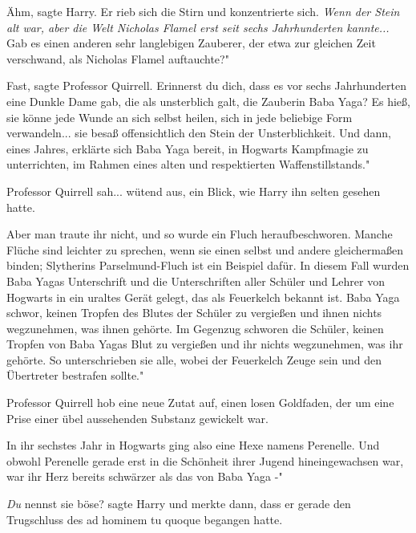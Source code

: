 \glqq{}Ähm\grqq{}, sagte Harry. Er rieb sich die Stirn und konzentrierte sich.
\emph{Wenn der Stein alt war, aber die Welt Nicholas Flamel erst seit sechs
Jahrhunderten kannte...} \glqq{}Gab es einen anderen sehr langlebigen Zauberer,
der etwa zur gleichen Zeit verschwand, als Nicholas Flamel auftauchte?"

\glqq{}Fast\grqq{}, sagte Professor Quirrell. \glqq{}Erinnerst du dich, dass es
vor sechs Jahrhunderten eine Dunkle Dame gab, die als unsterblich galt, die
Zauberin Baba Yaga? Es hieß, sie könne jede Wunde an sich selbst heilen, sich in
jede beliebige Form verwandeln... sie besaß offensichtlich den Stein der
Unsterblichkeit. Und dann, eines Jahres, erklärte sich Baba Yaga bereit, in
Hogwarts Kampfmagie zu unterrichten, im Rahmen eines alten und respektierten
Waffenstillstands."

Professor Quirrell sah... wütend aus, ein Blick, wie Harry ihn selten gesehen
hatte.

\glqq{}Aber man traute ihr nicht, und so wurde ein Fluch heraufbeschworen. Manche
Flüche sind leichter zu sprechen, wenn sie einen selbst und andere gleichermaßen
binden; Slytherins Parselmund-Fluch ist ein Beispiel dafür. In diesem Fall
wurden Baba Yagas Unterschrift und die Unterschriften aller Schüler und Lehrer
von Hogwarts in ein uraltes Gerät gelegt, das als Feuerkelch bekannt ist. Baba
Yaga schwor, keinen Tropfen des Blutes der Schüler zu vergießen und ihnen nichts
wegzunehmen, was ihnen gehörte. Im Gegenzug schworen die Schüler, keinen Tropfen
von Baba Yagas Blut zu vergießen und ihr nichts wegzunehmen, was ihr gehörte. So
unterschrieben sie alle, wobei der Feuerkelch Zeuge sein und den Übertreter
bestrafen sollte."

Professor Quirrell hob eine neue Zutat auf, einen losen Goldfaden, der um eine
Prise einer übel aussehenden Substanz gewickelt war.

\glqq{}In ihr sechstes Jahr in Hogwarts ging also eine Hexe namens Perenelle. Und
obwohl Perenelle gerade erst in die Schönheit ihrer Jugend hineingewachsen war,
war ihr Herz bereits schwärzer als das von Baba Yaga -"

\glqq{}\emph{Du} nennst sie böse?\grqq{} sagte Harry und merkte dann, dass er
gerade den Trugschluss des ad hominem tu quoque begangen hatte.

